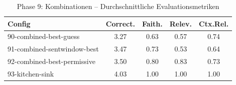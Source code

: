 \begin{table}[H]
\centering
\small
\begin{tabular}{lcccc}
\toprule
Config & Correct. & Faith. & Relev. & Ctx.Rel. \\
\midrule
90-combined-best-guess & 3.27 & 0.63 & 0.57 & 0.74 \\
91-combined-sentwindow-best & 3.47 & 0.73 & 0.53 & 0.64 \\
92-combined-best-permissive & 3.50 & 0.80 & 0.83 & 0.73 \\
93-kitchen-sink & 4.03 & 1.00 & 1.00 & 1.00 \\
\bottomrule
\end{tabular}
\caption{Phase 9: Kombinationen -- Durchschnittliche Evaluationsmetriken}
\label{tab:phase9_eval}
\end{table}